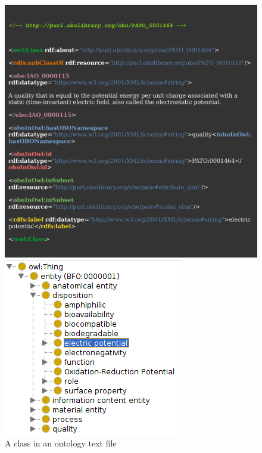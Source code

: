 \documentclass[english, xcolor=dvipsnames, aspectratio=169]{beamer}
\newcommand{\subsectiontitle}{}
\begin{document}
\begin{frame}{\subsectiontitle}
    \begin{figure}[ht]
        \begin{minipage}[b]{0.35\linewidth}
            \centering
            \includegraphics[width=\textwidth]{owltext.pdf}
            \caption{A class in an ontology text file}
            \label{fig:cifar10}
        \end{minipage}
        \hspace{0.5cm}
        \begin{minipage}[b]{0.35\linewidth}
            \centering
            \includegraphics[width=\textwidth]{classhierarchy.png}

\end{minipage}
\end{figure}
\end{frame}
\end{document}

